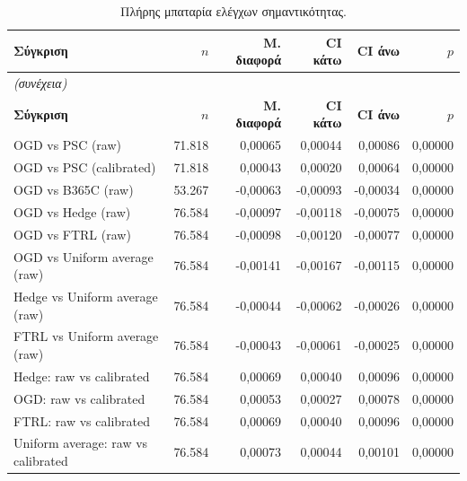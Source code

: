 {\footnotesize
\begin{longtable}{@{}lrrrrr@{}}
\caption{Πλήρης μπαταρία ελέγχων σημαντικότητας.}\label{app:sig}\\
\toprule \textbf{Σύγκριση} & \textbf{$n$} & \textbf{Μ. διαφορά} & \textbf{CI κάτω} & \textbf{CI άνω} & \textbf{$p$} \\\midrule\endfirsthead
\multicolumn{6}{l}{\emph{(συνέχεια)}}\\\toprule \textbf{Σύγκριση} & \textbf{$n$} & \textbf{Μ. διαφορά} & \textbf{CI κάτω} & \textbf{CI άνω} & \textbf{$p$} \\\midrule\endhead
\bottomrule\endfoot
OGD vs PSC (raw) & 71.818 & 0,00065 & 0,00044 & 0,00086 & 0,00000 \\
OGD vs PSC (calibrated) & 71.818 & 0,00043 & 0,00020 & 0,00064 & 0,00000 \\
OGD vs B365C (raw) & 53.267 & -0,00063 & -0,00093 & -0,00034 & 0,00000 \\
OGD vs Hedge (raw) & 76.584 & -0,00097 & -0,00118 & -0,00075 & 0,00000 \\
OGD vs FTRL (raw) & 76.584 & -0,00098 & -0,00120 & -0,00077 & 0,00000 \\
OGD vs Uniform average (raw) & 76.584 & -0,00141 & -0,00167 & -0,00115 & 0,00000 \\
Hedge vs Uniform average (raw) & 76.584 & -0,00044 & -0,00062 & -0,00026 & 0,00000 \\
FTRL vs Uniform average (raw) & 76.584 & -0,00043 & -0,00061 & -0,00025 & 0,00000 \\
Hedge: raw vs calibrated & 76.584 & 0,00069 & 0,00040 & 0,00096 & 0,00000 \\
OGD: raw vs calibrated & 76.584 & 0,00053 & 0,00027 & 0,00078 & 0,00000 \\
FTRL: raw vs calibrated & 76.584 & 0,00069 & 0,00040 & 0,00096 & 0,00000 \\
Uniform average: raw vs calibrated & 76.584 & 0,00073 & 0,00044 & 0,00101 & 0,00000 \\
\end{longtable}
}

